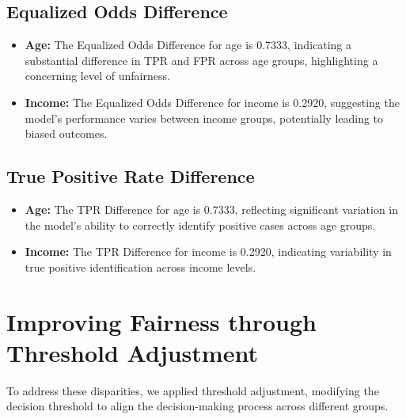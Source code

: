\documentclass[12pt,a4paper]{report}
\begin{document}
\subsection{Equalized Odds Difference}

\begin{itemize}
    \item \textbf{Age:} The Equalized Odds Difference for age is 0.7333, indicating a substantial difference in TPR and FPR across age groups, highlighting a concerning level of unfairness.
    
    \item \textbf{Income:} The Equalized Odds Difference for income is 0.2920, suggesting the model's performance varies between income groups, potentially leading to biased outcomes.
\end{itemize}

\subsection{True Positive Rate Difference}

\begin{itemize}
    \item \textbf{Age:} The TPR Difference for age is 0.7333, reflecting significant variation in the model's ability to correctly identify positive cases across age groups.
    
    \item \textbf{Income:} The TPR Difference for income is 0.2920, indicating variability in true positive identification across income levels.
\end{itemize}

\section{Improving Fairness through Threshold Adjustment}

To address these disparities, we applied threshold adjustment, modifying the decision threshold to align the decision-making process across different groups.\\
\end{document}
